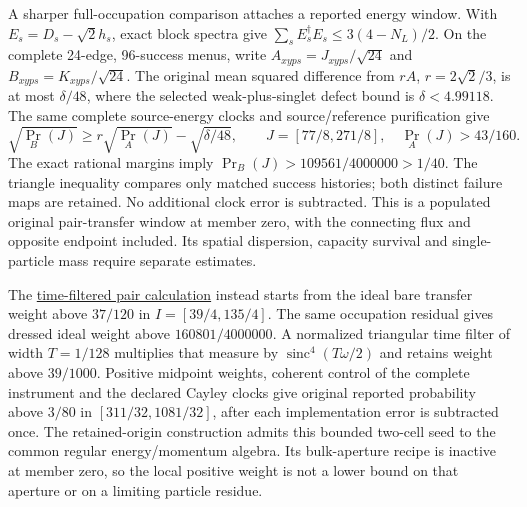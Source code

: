 A sharper full-occupation comparison attaches a reported energy window.
With $E_s=D_s-\sqrt2h_s$, exact block spectra give
$\sum_sE_s^\dagger E_s\le3(4-N_L)/2$. On the complete 24-edge,
96-success menus, write $A_{xyps}=J_{xyps}/\sqrt{24}$ and
$B_{xyps}=K_{xyps}/\sqrt{24}$. The original mean squared difference from
$rA$, $r=2\sqrt2/3$, is at most $\delta/48$, where the selected
weak-plus-singlet defect bound is $\delta<4.99118$. The same complete
source-energy clocks and source/reference purification give
\[
 \sqrt{\Pr_B(J)}\ge r\sqrt{\Pr_A(J)}-\sqrt{\delta/48},
 \qquad J=[77/8,271/8],\quad\Pr_A(J)>43/160.
\]
The exact rational margins imply
$\Pr_B(J)>109561/4000000>1/40$. The triangle inequality compares only
matched success histories; both distinct failure maps are retained.
No additional clock error is subtracted. This is a populated original
pair-transfer window at member zero, with the connecting flux and opposite
endpoint included. Its spatial dispersion, capacity survival and
single-particle mass require separate estimates.

The \href{https://github.com/FloatingPragma/observer-patch-holography/blob/main/model/particle_candidate_charged_propagation/PROOF.md}{time-filtered pair calculation}
instead starts from the ideal bare transfer weight above $37/120$ in
$I=[39/4,135/4]$. The same occupation residual gives dressed ideal weight
above $160801/4000000$. A normalized triangular time filter of width
$T=1/128$ multiplies that measure by
$\operatorname{sinc}^4(T\omega/2)$ and retains weight above $39/1000$.
Positive midpoint weights, coherent control of the complete instrument
and the declared Cayley clocks give original reported probability above
$3/80$ in $[311/32,1081/32]$, after each implementation error is subtracted
once. The retained-origin construction admits this bounded two-cell seed
to the common regular energy/momentum algebra. Its bulk-aperture recipe
is inactive at member zero, so the local positive weight is not a lower
bound on that aperture or on a limiting particle residue.

